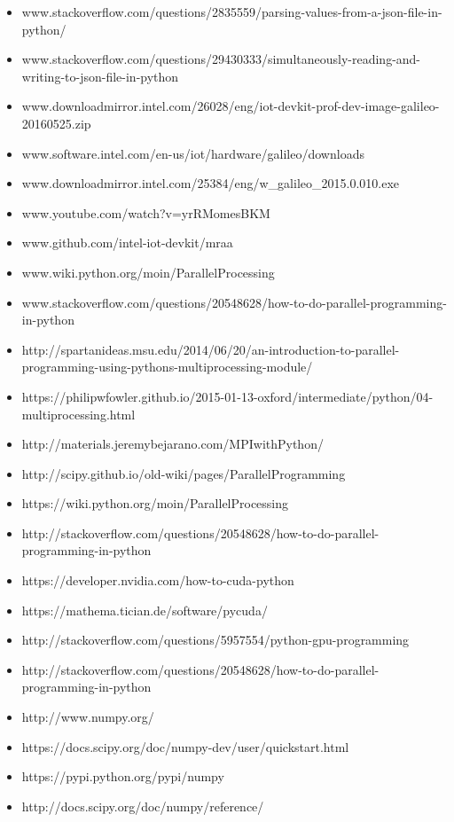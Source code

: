 \documentclass[11pt,a4paper]{article}
\begin{document}
\begin{itemize}
        \item  www.stackoverflow.com/questions/2835559/parsing-values-from-a-json-file-in-python/
        \item  www.stackoverflow.com/questions/29430333/simultaneously-reading-and-writing-to-json-file-in-python
        \item  www.downloadmirror.intel.com/26028/eng/iot-devkit-prof-dev-image-galileo-20160525.zip
        \item  www.software.intel.com/en-us/iot/hardware/galileo/downloads
        \item  www.downloadmirror.intel.com/25384/eng/w\_galileo\_2015.0.010.exe
        \item  www.youtube.com/watch?v=yrRMomesBKM
        \item  www.github.com/intel-iot-devkit/mraa
        \item  www.wiki.python.org/moin/ParallelProcessing
        \item  www.stackoverflow.com/questions/20548628/how-to-do-parallel-programming-in-python
        \item  http://spartanideas.msu.edu/2014/06/20/an-introduction-to-parallel-programming-using-pythons-multiprocessing-module/
        \item  https://philipwfowler.github.io/2015-01-13-oxford/intermediate/python/04-multiprocessing.html
        \item  http://materials.jeremybejarano.com/MPIwithPython/
        \item  http://scipy.github.io/old-wiki/pages/ParallelProgramming
        \item  https://wiki.python.org/moin/ParallelProcessing
        \item  http://stackoverflow.com/questions/20548628/how-to-do-parallel-programming-in-python
        \item  https://developer.nvidia.com/how-to-cuda-python
        \item  https://mathema.tician.de/software/pycuda/
        \item  http://stackoverflow.com/questions/5957554/python-gpu-programming
        \item  http://stackoverflow.com/questions/20548628/how-to-do-parallel-programming-in-python
        \item  http://www.numpy.org/
        \item  https://docs.scipy.org/doc/numpy-dev/user/quickstart.html
        \item  https://pypi.python.org/pypi/numpy
        \item  http://docs.scipy.org/doc/numpy/reference/

    \end{itemize}
	
\end{document}
